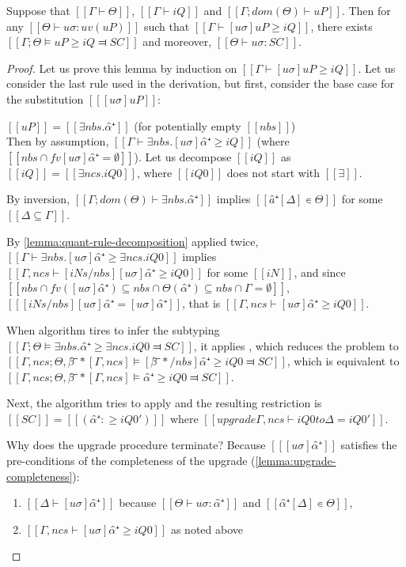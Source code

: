 \begin{lemma} \label{lemma:pos-subt-completeness}
    Suppose that $[[Γ ⊢ Θ]]$, $[[Γ ⊢ iQ]]$ and $[[Γ ; dom(Θ) ⊢  uP]]$.
    Then for any $[[Θ ⊢ uσ : uv(uP)]]$ such that $[[ Γ ⊢ [uσ]uP ≥ iQ ]]$,
    there exists $[[Γ; Θ ⊨ uP ≥ iQ ⫤ SC]]$ and moreover, $[[ Θ ⊢ uσ : SC ]]$.
\end{lemma}
\begin{proof}
    Let us prove this lemma by induction on $[[ Γ ⊢ [uσ]uP ≥ iQ ]]$.
    Let us consider the last rule used in the derivation,
    but first, consider the base case for the substitution $[[ [uσ]uP ]]$:
    \begin{caseof}
        \item \label{case:pos-subt-complete-base} $[[uP]] = [[ ∃nbs.α̂⁺ ]]$ 
            (for potentially empty $[[nbs]]$)\\
            Then by assumption, $[[ Γ ⊢ ∃nbs.[uσ]α̂⁺ ≥ iQ ]]$ (where $[[ {nbs} ∩ fv [uσ]α̂⁺ = ∅]]$).
            Let us decompose $[[iQ]]$ as $[[iQ]] = [[∃ncs.iQ0]]$, where $[[iQ0]]$ does
            not start with $[[∃]]$. 

            By inversion, $[[Γ ; dom(Θ) ⊢  ∃nbs.α̂⁺]]$ implies $[[â⁺[Δ] ∊ Θ]]$ for some 
            $[[{Δ} ⊆ Γ]]$.

            By \cref{lemma:quant-rule-decomposition} applied twice, 
            $[[ Γ ⊢ ∃nbs.[uσ]α̂⁺ ≥ ∃ncs.iQ0 ]]$ implies
            $[[ Γ,ncs  ⊢ [iNs/nbs][uσ]α̂⁺ ≥ iQ0 ]]$ for some $[[iN]]$, 
            and since $[[ {nbs} ∩ fv([uσ]α̂⁺) ⊆ {nbs} ∩ {Θ(α̂⁺)} ⊆ {nbs} ∩ Γ = ∅ ]]$,
            $[[ [iNs/nbs][uσ]α̂⁺ = [uσ]α̂⁺ ]]$, that is $[[ Γ,ncs ⊢ [uσ]α̂⁺ ≥ iQ0]]$.

            When algorithm tires to infer the subtyping 
            $[[Γ; Θ ⊨ ∃nbs.α̂⁺ ≥ ∃ncs.iQ0 ⫤ SC]]$,
            it applies ,
            which reduces the problem to
            $[[Γ, ncs; Θ, β̂⁻*[Γ, ncs] ⊨ [β̂⁻*/nbs] α̂⁺ ≥ iQ0 ⫤ SC]]$, 
            which is equivalent to 
            $[[Γ, ncs; Θ, β̂⁻*[Γ, ncs] ⊨ α̂⁺ ≥ iQ0 ⫤ SC]]$.

            Next, the algorithm tries to apply
            and the resulting restriction is $[[SC]] = [[(α̂⁺ :≥ iQ0')]]$ where
            $[[upgrade Γ, ncs ⊢ iQ0 to Δ = iQ0']]$.

            Why does the upgrade procedure terminate?
            Because $[[ [uσ]α̂⁺ ]]$ satisfies the pre-conditions of the completeness of the upgrade
            (\cref{lemma:upgrade-completeness}):
            \begin{enumerate}
                \item $[[Δ ⊢ [uσ]α̂⁺ ]]$ because $[[Θ ⊢ uσ : {α̂⁺}]]$ and $[[α̂⁺[Δ] ∊ Θ]]$,
                \item $[[ Γ,ncs ⊢ [uσ]α̂⁺ ≥ iQ0]]$ as noted above
            \end{enumerate}


\end{caseof}
\end{proof}
